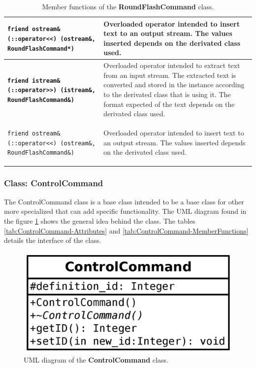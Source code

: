 \documentclass[11pt,twoside,openany,x11names,svgnames]{memoir}
\begin{document}
\begin{table}[h]
\begin{tabular}{| >{\bfseries}p{10.5cm} | p{5cm} |}
	\hline
	
	\texttt{friend ostream\& (::operator<<) (ostream\&, RoundFlashCommand*)} & Overloaded operator intended to insert text to an output stream. The values inserted depends on the derivated class used. \\
	
	\hline
	
	\texttt{friend istream\& (::operator>>) (istream\&, RoundFlashCommand\&)} & Overloaded operator intended to extract text from an input stream. The extracted text is converted and stored in the instance according to the derivated class that is using it. The format expected of the text depends on the derivated class used. \\
	
	\hline
	
	\texttt{friend ostream\& (::operator<<) (ostream\&, RoundFlashCommand\&)} & Overloaded operator intended to insert text to an output stream. The values inserted depends on the derivated class used. \\
	
	\hline
\end{tabular}
\caption{Member functions of the \textbf{RoundFlashCommand} class.}
\label{tab:RoundFlashCommand-MemberFunctions}
\end{table}

\clearpage

\subsubsection{Class: ControlCommand}\label{Class-ControlCommand}

The ControlCommand class is a base class intended to be a base class for other more specialized that can add specific functionality. The UML diagram found in the figure \ref{fig:class-control-command} shows the general idea behind the class. The tables \ref{tab:ControlCommand-Attributes} and \ref{tab:ControlCommand-MemberFunctions} details the interface of the class.

\begin{figure}
	\centering
	\includegraphics[scale=0.2, clip=true, trim= 0pt 0pt 0pt 0pt]{images/chapter03-image24}
	\caption{UML diagram of the \textbf{ControlCommand} class.}
	\label{fig:class-control-command}
\end{figure}
\end{document}
